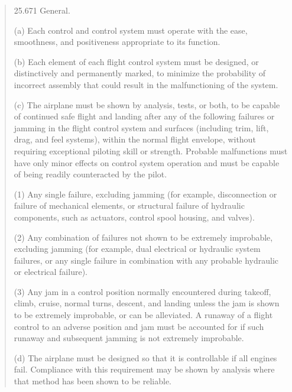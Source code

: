 \begin{quotation}
\begin{scriptsize}
25.671   General.

(a) Each control and control system must operate with the ease, smoothness, and positiveness appropriate to its function.

(b) Each element of each flight control system must be designed, or distinctively and permanently marked, to minimize the probability of incorrect assembly that could result in the malfunctioning of the system.

(c) The airplane must be shown by analysis, tests, or both, to be capable of continued safe flight and landing after any of the following failures or jamming in the flight control system and surfaces (including trim, lift, drag, and feel systems), within the normal flight envelope, without requiring exceptional piloting skill or strength. Probable malfunctions must have only minor effects on control system operation and must be capable of being readily counteracted by the pilot.

(1) Any single failure, excluding jamming (for example, disconnection or failure of mechanical elements, or structural failure of hydraulic components, such as actuators, control spool housing, and valves).

(2) Any combination of failures not shown to be extremely improbable, excluding jamming (for example, dual electrical or hydraulic system failures, or any single failure in combination with any probable hydraulic or electrical failure).

(3) Any jam in a control position normally encountered during takeoff, climb, cruise, normal turns, descent, and landing unless the jam is shown to be extremely improbable, or can be alleviated. A runaway of a flight control to an adverse position and jam must be accounted for if such runaway and subsequent jamming is not extremely improbable.

(d) The airplane must be designed so that it is controllable if all engines fail. Compliance with this requirement may be shown by analysis where that method has been shown to be reliable.

\end{scriptsize}
\end{quotation}
